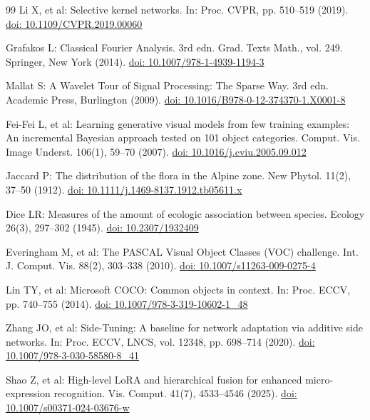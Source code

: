 \documentclass[pdflatex,sn-mathphys-num]{sn-jnl}
\theoremstyle{thmstyleone}
\theoremstyle{thmstyletwo}
\theoremstyle{thmstylethree}
\begin{document}
\begin{thebibliography}{99}
Li X, et al:
Selective kernel networks.
In: Proc. CVPR, pp. 510--519 (2019).
\href{https://doi.org/10.1109/CVPR.2019.00060}{doi: 10.1109/CVPR.2019.00060}

Grafakos L:
Classical Fourier Analysis.
3rd edn. Grad. Texts Math., vol. 249.
Springer, New York (2014).
\href{https://doi.org/10.1007/978-1-4939-1194-3}{doi: 10.1007/978-1-4939-1194-3}

Mallat S:
A Wavelet Tour of Signal Processing: The Sparse Way.
3rd edn. Academic Press, Burlington (2009).
\href{https://doi.org/10.1016/B978-0-12-374370-1.X0001-8}{doi: 10.1016/B978-0-12-374370-1.X0001-8}

Fei-Fei L, et al:
Learning generative visual models from few training examples: An incremental Bayesian approach tested on 101 object categories.
Comput. Vis. Image Underst. 106(1), 59--70 (2007).
\href{https://doi.org/10.1016/j.cviu.2005.09.012}{doi: 10.1016/j.cviu.2005.09.012}


Jaccard P:
The distribution of the flora in the Alpine zone.
New Phytol. 11(2), 37--50 (1912).
\href{https://doi.org/10.1111/j.1469-8137.1912.tb05611.x}{doi: 10.1111/j.1469-8137.1912.tb05611.x}

Dice LR:
Measures of the amount of ecologic association between species.
Ecology 26(3), 297--302 (1945).
\href{https://doi.org/10.2307/1932409}{doi: 10.2307/1932409}

Everingham M, et al:
The PASCAL Visual Object Classes (VOC) challenge.
Int. J. Comput. Vis. 88(2), 303--338 (2010).
\href{https://doi.org/10.1007/s11263-009-0275-4}{doi: 10.1007/s11263-009-0275-4}

Lin TY, et al:
Microsoft COCO: Common objects in context.
In: Proc. ECCV, pp. 740--755 (2014).
\href{https://doi.org/10.1007/978-3-319-10602-1_48}{doi: 10.1007/978-3-319-10602-1\_48}

Zhang JO, et al:
Side-Tuning: A baseline for network adaptation via additive side networks.
In: Proc. ECCV, LNCS, vol. 12348, pp. 698--714 (2020).
\href{https://doi.org/10.1007/978-3-030-58580-8_41}{doi: 10.1007/978-3-030-58580-8\_41}

Shao Z, et al:
High-level LoRA and hierarchical fusion for enhanced micro-expression recognition.
Vis. Comput. 41(7), 4533--4546 (2025).
\href{https://doi.org/10.1007/s00371-024-03676-w}{doi: 10.1007/s00371-024-03676-w}


\end{thebibliography}
\end{document}
